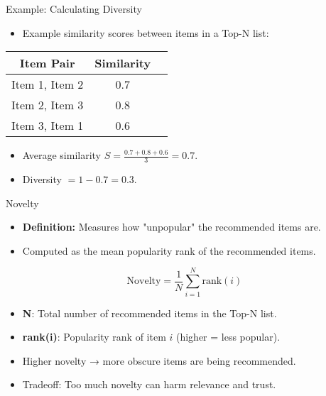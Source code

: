 \documentclass{beamer}
\begin{document}
\begin{frame}{Example: Calculating Diversity}
\begin{itemize}
    \item Example similarity scores between items in a Top-N list:
\end{itemize}
\begin{center}
\begin{tabular}{|c|c|c|}
\hline
\textbf{Item Pair} & \textbf{Similarity} \\ \hline
Item 1, Item 2 & 0.7 \\ \hline
Item 2, Item 3 & 0.8 \\ \hline
Item 3, Item 1 & 0.6 \\ \hline
\end{tabular}
\end{center}
\begin{itemize}
    \item Average similarity \( S = \frac{0.7 + 0.8 + 0.6}{3} = 0.7 \).
    \item Diversity \( = 1 - 0.7 = 0.3 \).
\end{itemize}
\end{frame}

\begin{frame}{Novelty}
\begin{itemize}
    \item \textbf{Definition:} Measures how "unpopular" the recommended items are.
    \item Computed as the mean popularity rank of the recommended items.
\end{itemize}

\[
\text{Novelty} = \frac{1}{N} \sum_{i=1}^{N} \text{rank}(i)
\]

\begin{itemize}
    \item \textbf{N}: Total number of recommended items in the Top-N list.
    \item \textbf{rank(i)}: Popularity rank of item \( i \) (higher = less popular).
    \item Higher novelty → more obscure items are being recommended.
    \item Tradeoff: Too much novelty can harm relevance and trust.
\end{itemize}
\end{frame}
\end{document}
